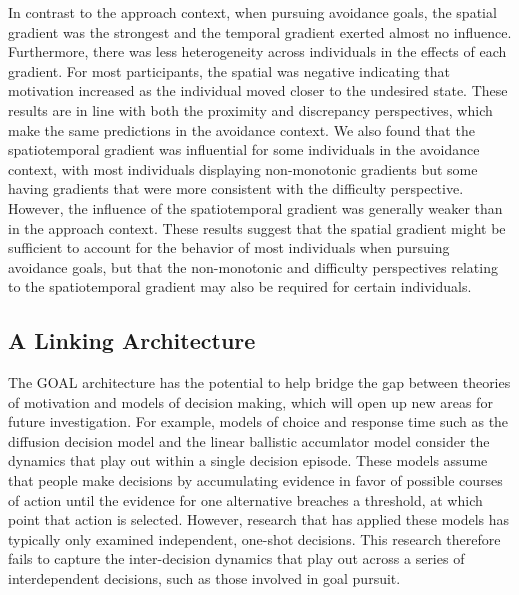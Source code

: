 \documentclass[a4paper,doc,natbib,donotrepeattitle]{apa6}
\begin{document}
In contrast to the approach context, when pursuing avoidance goals, the spatial gradient was the strongest and the temporal gradient exerted almost no influence. Furthermore, there was less heterogeneity across individuals in the effects of each gradient. For most participants, the spatial was negative indicating that motivation increased as the individual moved closer to the undesired state. These results are in line with both the proximity and discrepancy perspectives, which make the same predictions in the avoidance context. We also found that the spatiotemporal gradient was influential for some individuals in the avoidance context, with most individuals displaying non-monotonic gradients but some having gradients that were more consistent with the difficulty perspective. However, the influence of the spatiotemporal gradient was generally weaker than in the approach context. These results suggest that the spatial gradient might be sufficient to account for the behavior of most individuals when pursuing avoidance goals, but that the non-monotonic and difficulty perspectives relating to the spatiotemporal gradient may also be required for certain individuals.

\subsection{A Linking Architecture}

The GOAL architecture has the potential to help bridge the gap between theories of motivation and models of decision making, which will open up new areas for future investigation. For example, models of choice and response time such as the diffusion decision model \citep[DDM;][]{Ratcliff2018a,Ratcliff1978,Ratcliff2008} and the linear ballistic accumlator model \citep[LBA;][]{Brown2008} consider the dynamics that play out within a single decision episode. These models assume that people make decisions by accumulating evidence in favor of possible courses of action until the evidence for one alternative breaches a threshold, at which point that action is selected. However, research that has applied these models has typically only examined independent, one-shot decisions. This research therefore fails to capture the inter-decision dynamics that play out across a series of interdependent decisions, such as those involved in goal pursuit.
\end{document}
